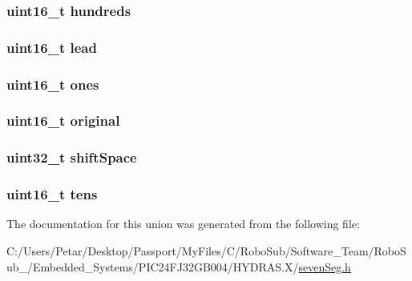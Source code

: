 \subsubsection[{hundreds}]{\setlength{\rightskip}{0pt plus 5cm}uint16\+\_\+t hundreds}\label{union_b_c_dspace_a337f8d89d05b6efe86bf48a732908f14}
\hypertarget{union_b_c_dspace_af5ce88c180fdba2e4c3ca367c17f9b42}{}
\subsubsection[{lead}]{\setlength{\rightskip}{0pt plus 5cm}uint16\+\_\+t lead}\label{union_b_c_dspace_af5ce88c180fdba2e4c3ca367c17f9b42}
\hypertarget{union_b_c_dspace_af4c34c481c478daf8ff3fb4e59785f3e}{}
\subsubsection[{ones}]{\setlength{\rightskip}{0pt plus 5cm}uint16\+\_\+t ones}\label{union_b_c_dspace_af4c34c481c478daf8ff3fb4e59785f3e}
\hypertarget{union_b_c_dspace_a837b0ee13fe5df2c6154d9cd0b1e4cab}{}
\subsubsection[{original}]{\setlength{\rightskip}{0pt plus 5cm}uint16\+\_\+t original}\label{union_b_c_dspace_a837b0ee13fe5df2c6154d9cd0b1e4cab}
\hypertarget{union_b_c_dspace_a766089344203b4d7391ede75e6d896b8}{}
\subsubsection[{shift\+Space}]{\setlength{\rightskip}{0pt plus 5cm}uint32\+\_\+t shift\+Space}\label{union_b_c_dspace_a766089344203b4d7391ede75e6d896b8}
\hypertarget{union_b_c_dspace_ab009def89f5ae63afa966be922b69bca}{}
\subsubsection[{tens}]{\setlength{\rightskip}{0pt plus 5cm}uint16\+\_\+t tens}\label{union_b_c_dspace_ab009def89f5ae63afa966be922b69bca}


The documentation for this union was generated from the following file\+:\begin{DoxyCompactItemize}
\item 
C\+:/\+Users/\+Petar/\+Desktop/\+Passport/\+My\+Files/\+C/\+Robo\+Sub/\+Software\+\_\+\+Team/\+Robo\+Sub\+\_/\+Embedded\+\_\+\+Systems/\+P\+I\+C24\+F\+J32\+G\+B004/\+H\+Y\+D\+R\+A\+S.\+X/\hyperlink{seven_seg_8h}{seven\+Seg.\+h}\end{DoxyCompactItemize}
